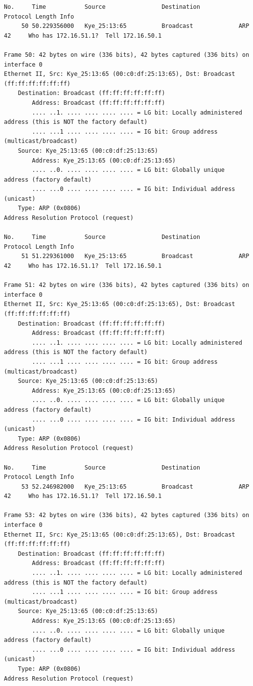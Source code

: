 \documentclass[a4paper,11pt]{article}
\begin{document}
\begin{lstlisting}
No.     Time           Source                Destination           Protocol Length Info
     50 50.229356000   Kye_25:13:65          Broadcast             ARP      42     Who has 172.16.51.1?  Tell 172.16.50.1

Frame 50: 42 bytes on wire (336 bits), 42 bytes captured (336 bits) on interface 0
Ethernet II, Src: Kye_25:13:65 (00:c0:df:25:13:65), Dst: Broadcast (ff:ff:ff:ff:ff:ff)
    Destination: Broadcast (ff:ff:ff:ff:ff:ff)
        Address: Broadcast (ff:ff:ff:ff:ff:ff)
        .... ..1. .... .... .... .... = LG bit: Locally administered address (this is NOT the factory default)
        .... ...1 .... .... .... .... = IG bit: Group address (multicast/broadcast)
    Source: Kye_25:13:65 (00:c0:df:25:13:65)
        Address: Kye_25:13:65 (00:c0:df:25:13:65)
        .... ..0. .... .... .... .... = LG bit: Globally unique address (factory default)
        .... ...0 .... .... .... .... = IG bit: Individual address (unicast)
    Type: ARP (0x0806)
Address Resolution Protocol (request)

No.     Time           Source                Destination           Protocol Length Info
     51 51.229361000   Kye_25:13:65          Broadcast             ARP      42     Who has 172.16.51.1?  Tell 172.16.50.1

Frame 51: 42 bytes on wire (336 bits), 42 bytes captured (336 bits) on interface 0
Ethernet II, Src: Kye_25:13:65 (00:c0:df:25:13:65), Dst: Broadcast (ff:ff:ff:ff:ff:ff)
    Destination: Broadcast (ff:ff:ff:ff:ff:ff)
        Address: Broadcast (ff:ff:ff:ff:ff:ff)
        .... ..1. .... .... .... .... = LG bit: Locally administered address (this is NOT the factory default)
        .... ...1 .... .... .... .... = IG bit: Group address (multicast/broadcast)
    Source: Kye_25:13:65 (00:c0:df:25:13:65)
        Address: Kye_25:13:65 (00:c0:df:25:13:65)
        .... ..0. .... .... .... .... = LG bit: Globally unique address (factory default)
        .... ...0 .... .... .... .... = IG bit: Individual address (unicast)
    Type: ARP (0x0806)
Address Resolution Protocol (request)

No.     Time           Source                Destination           Protocol Length Info
     53 52.246982000   Kye_25:13:65          Broadcast             ARP      42     Who has 172.16.51.1?  Tell 172.16.50.1

Frame 53: 42 bytes on wire (336 bits), 42 bytes captured (336 bits) on interface 0
Ethernet II, Src: Kye_25:13:65 (00:c0:df:25:13:65), Dst: Broadcast (ff:ff:ff:ff:ff:ff)
    Destination: Broadcast (ff:ff:ff:ff:ff:ff)
        Address: Broadcast (ff:ff:ff:ff:ff:ff)
        .... ..1. .... .... .... .... = LG bit: Locally administered address (this is NOT the factory default)
        .... ...1 .... .... .... .... = IG bit: Group address (multicast/broadcast)
    Source: Kye_25:13:65 (00:c0:df:25:13:65)
        Address: Kye_25:13:65 (00:c0:df:25:13:65)
        .... ..0. .... .... .... .... = LG bit: Globally unique address (factory default)
        .... ...0 .... .... .... .... = IG bit: Individual address (unicast)
    Type: ARP (0x0806)
Address Resolution Protocol (request)


\end{lstlisting}
\end{document}
